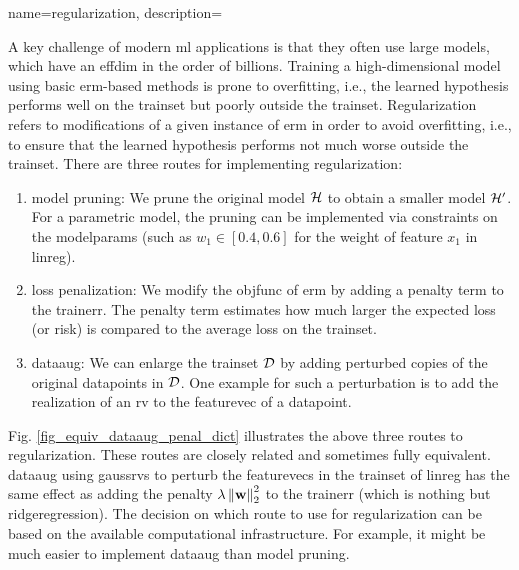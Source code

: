 {name={regularization}, 
	description={A key challenge of modern \gls{ml} applications is that they often 
		use large \glspl{model}, which have an \gls{effdim} in the order of billions. 
		Training a high-dimensional \gls{model} using basic \gls{erm}-based methods
		is prone to \gls{overfitting}, i.e., the learned \gls{hypothesis} performs well on the \gls{trainset} 
		but poorly outside the \gls{trainset}. Regularization refers to modifications of a given instance 
		of \gls{erm} in order to avoid \gls{overfitting}, i.e., to ensure that the learned \gls{hypothesis} performs 
		not much worse outside the \gls{trainset}. There are three routes for implementing 
		regularization: 
		\begin{enumerate}[label=\arabic*)]
			\item {\Gls{model} pruning:} We prune the original \gls{model} $\mathcal{H}$ to obtain a 
			smaller \gls{model} $\mathcal{H}'$. For a parametric \gls{model}, the pruning can be 
			implemented via constraints on the \gls{modelparams} (such as $w_{1} \in [0.4,0.6]$ for 
			the weight of \gls{feature} $x_{1}$ in \gls{linreg}).
			\item {\Gls{loss} penalization:} We modify the \gls{objfunc} of \gls{erm} by adding a 
			penalty term to the \gls{trainerr}. The penalty term estimates how much larger the expected \gls{loss} (or \gls{risk}) 
			is compared to the average \gls{loss} on the \gls{trainset}. 
			\item {\Gls{dataaug}:} We can enlarge the \gls{trainset} $\mathcal{D}$ by adding 
			perturbed copies of the original \glspl{datapoint} in $\mathcal{D}$. One example for such 
			a perturbation is to add the \gls{realization} of an \gls{rv} to the \gls{featurevec} 
			of a \gls{datapoint}. 
		\end{enumerate} 
		Fig. \ref{fig_equiv_dataaug_penal_dict} illustrates the above three routes to regularization. 
		These routes are closely related and sometimes fully equivalent. \Gls{dataaug} using \glspl{gaussrv} 
		to perturb the \glspl{featurevec} in the \gls{trainset} of \gls{linreg} 
		has the same effect as adding the penalty 
		$\lambda \left\Vert {{\bf w}} \right\Vert_{2}^2$ to the \gls{trainerr} (which is nothing but \gls{ridgeregression}). 
        		The decision on which route to use for regularization can be based on the 
        		available computational infrastructure. For example, it might be much easier to 
        		implement \gls{dataaug} than \gls{model} pruning. 
		\begin{figure}[H]

\end{figure}}}
